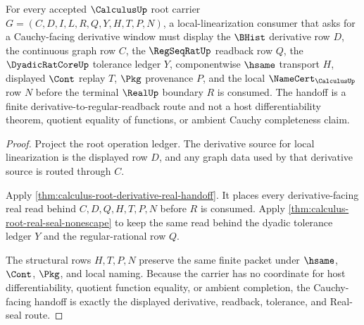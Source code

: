 \begin{theorem}
\label{thm:calculus-root-local-linearization-cauchy-handoff}
For every accepted $\CalculusUp$ root carrier $G=(C,D,I,L,R,Q,Y,H,T,P,N)$, a local-linearization consumer that asks for a Cauchy-facing derivative window must display the $\BHist$ derivative row $D$, the continuous graph row $C$, the $\RegSeqRatUp$ readback row $Q$, the $\DyadicRatCoreUp$ tolerance ledger $Y$, componentwise $\hsame$ transport $H$, displayed $\Cont$ replay $T$, $\Pkg$ provenance $P$, and the local $\NameCert_{\CalculusUp}$ row $N$ before the terminal $\RealUp$ boundary $R$ is consumed. The handoff is a finite derivative-to-regular-readback route and not a host differentiability theorem, quotient equality of functions, or ambient Cauchy completeness claim.
\end{theorem}
\begin{proof}
Project the root operation ledger. The derivative source for local linearization is the displayed row $D$, and any graph data used by that derivative source is routed through $C$.

Apply \autoref{thm:calculus-root-derivative-real-handoff}. It places every derivative-facing real read behind $C,D,Q,H,T,P,N$ before $R$ is consumed. Apply \autoref{thm:calculus-root-real-seal-nonescape} to keep the same read behind the dyadic tolerance ledger $Y$ and the regular-rational row $Q$.

The structural rows $H,T,P,N$ preserve the same finite packet under $\hsame$, $\Cont$, $\Pkg$, and local naming. Because the carrier has no coordinate for host differentiability, quotient function equality, or ambient completion, the Cauchy-facing handoff is exactly the displayed derivative, readback, tolerance, and Real-seal route.
\end{proof}
